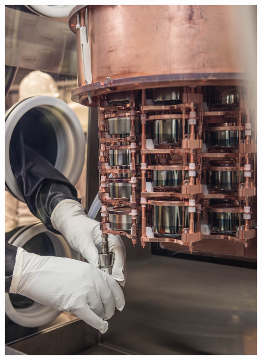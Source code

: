 \begin{figure}[h]

\hfil  \includegraphics[width=.45\textwidth]{MJD_StringInstall.jpg} \hfil 


\label{MJD_StringInstall}  %

\end{figure}
